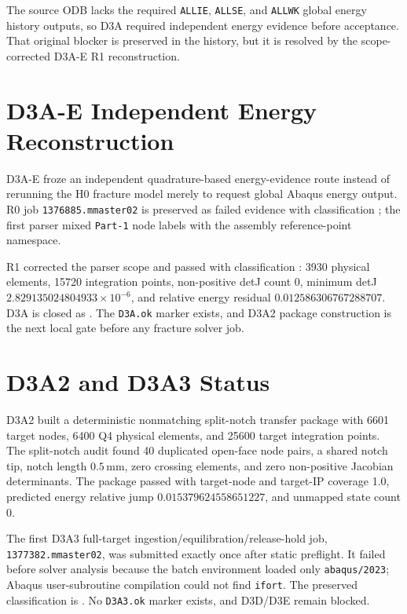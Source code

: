 \documentclass[11pt,a4paper]{article}
\begin{document}
The source ODB lacks the required \texttt{ALLIE}, \texttt{ALLSE}, and
\texttt{ALLWK} global energy history outputs, so D3A required independent
energy evidence before acceptance. That original blocker is preserved in the
history, but it is resolved by the scope-corrected D3A-E R1 reconstruction.

\section{D3A-E Independent Energy Reconstruction}
D3A-E froze an independent quadrature-based energy-evidence route instead of
rerunning the H0 fracture model merely to request global Abaqus energy output.
R0 job \texttt{1376885.mmaster02} is preserved as failed evidence with
classification ; the
first parser mixed \texttt{Part-1} node labels with the assembly reference-point
namespace.

R1 corrected the parser scope and passed with classification
: 3930 physical elements, 15720
integration points, non-positive detJ count 0, minimum detJ
$2.829135024804933\times10^{-6}$, and relative energy residual
$0.012586306767288707$. D3A is closed as
. The
\texttt{D3A.ok} marker exists, and D3A2 package construction is the next local
gate before any fracture solver job.

\section{D3A2 and D3A3 Status}
D3A2 built a deterministic nonmatching split-notch transfer package with 6601
target nodes, 6400 Q4 physical elements, and 25600 target integration points.
The split-notch audit found 40 duplicated open-face node pairs, a shared notch
tip, notch length $0.5\,\mathrm{mm}$, zero crossing elements, and zero
non-positive Jacobian determinants. The package passed with target-node and
target-IP coverage 1.0, predicted energy relative jump
$0.015379624558651227$, and unmapped state count 0.

The first D3A3 full-target ingestion/equilibration/release-hold job,
\texttt{1377382.mmaster02}, was submitted exactly once after static preflight.
It failed before solver analysis because the batch environment loaded only
\texttt{abaqus/2023}; Abaqus user-subroutine compilation could not find
\texttt{ifort}. The preserved classification is
. No \texttt{D3A3.ok} marker
exists, and D3D/D3E remain blocked.
\end{document}
